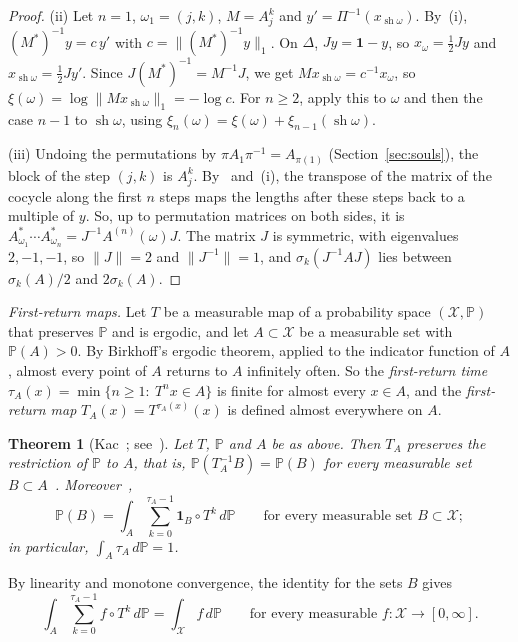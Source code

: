 \documentclass[11pt]{amsart}
\newtheorem{lettertheorem}{Theorem}%
\theoremstyle{definition}
\theoremstyle{remark}
\newcommand{\one}{\mathbf 1}
\newcommand{\norm}[1]{\lVert #1\rVert}
\begin{document}
\begin{proof}
(ii) Let $n=1$, $\omega_1=(j,k)$, $M=A_j^k$ and $y'=\Pi^{-1}(x_{\operatorname{sh}\omega})$. By~(i), $(M^*)^{-1}y=c\,y'$ with $c=\norm{(M^*)^{-1}y}_1$. On $\Delta$, $Jy=\one-y$, so $x_\omega=\frac12Jy$ and $x_{\operatorname{sh}\omega}=\frac12Jy'$. Since $J(M^*)^{-1}=M^{-1}J$, we get $Mx_{\operatorname{sh}\omega}=c^{-1}x_\omega$, so $\xi(\omega)=\log\norm{Mx_{\operatorname{sh}\omega}}_1=-\log c$. For $n\ge2$, apply this to $\omega$ and then the case $n-1$ to $\operatorname{sh}\omega$, using $\xi_n(\omega)=\xi(\omega)+\xi_{n-1}(\operatorname{sh}\omega)$.

(iii) Undoing the permutations by $\pi A_1\pi^{-1}=A_{\pi(1)}$ (Section~\ref{sec:souls}), the block of the step $(j,k)$ is $A_j^k$. By~\cite[Def.~12]{AHSinv} and~(i), the transpose of the matrix of the cocycle along the first $n$ steps maps the lengths after these steps back to a multiple of $y$. So, up to permutation matrices on both sides, it is $A_{\omega_1}^*\cdots A_{\omega_n}^*=J^{-1}A^{(n)}(\omega)J$. The matrix $J$ is symmetric, with eigenvalues $2,-1,-1$, so $\norm J=2$ and $\norm{J^{-1}}=1$, and $\sigma_k(J^{-1}AJ)$ lies between $\sigma_k(A)/2$ and $2\sigma_k(A)$.
\end{proof}

\emph{First-return maps.}
Let $T$ be a measurable map of a probability space $(\mathcal X,\mathbb P)$ that preserves $\mathbb P$ and is ergodic, and let $A\subset\mathcal X$ be a measurable set with $\mathbb P(A)>0$. By Birkhoff's ergodic theorem, applied to the indicator function of $A$, almost every point of $A$ returns to $A$ infinitely often. So the \emph{first-return time} $\tau_A(x)=\min\{n\ge1:\ T^nx\in A\}$ is finite for almost every $x\in A$, and the \emph{first-return map} $T_A(x)=T^{\tau_A(x)}(x)$ is defined almost everywhere on $A$.

\begin{lettertheorem}[Kac~\cite{Kac47}; see~\cite{Aar97}]\label{thm:kac}
Let $T$, $\mathbb P$ and $A$ be as above. Then $T_A$ preserves the restriction of $\mathbb P$ to $A$, that is, $\mathbb P(T_A^{-1}B)=\mathbb P(B)$ for every measurable set $B\subset A$~\cite[Prop.~1.5.3]{Aar97}. Moreover~\cite[1.5.5 and its proof]{Aar97},
\[
  \mathbb P(B)=\int_A\sum_{k=0}^{\tau_A-1}\mathbf 1_B\circ T^k\,d\mathbb P\qquad\text{for every measurable set }B\subset\mathcal X;
\]
in particular, $\int_A\tau_A\,d\mathbb P=1$.
\end{lettertheorem}

By linearity and monotone convergence, the identity for the sets $B$ gives
\begin{equation}\label{eq:kac}
  \int_A\sum_{k=0}^{\tau_A-1}f\circ T^k\,d\mathbb P=\int_{\mathcal X}f\,d\mathbb P\qquad\text{for every measurable }f:\mathcal X\to[0,\infty] .
\end{equation}
\end{document}
